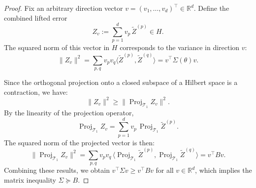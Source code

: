 \documentclass[10pt,a4paper]{amsart}
\begin{document}
\begin{proof}
Fix an arbitrary direction vector \(v=(v_1,\dots,v_d)^\top\in\mathbb{R}^d\). Define the combined lifted error
\[
Z_v := \sum_{p=1}^d v_p\,\widetilde Z^{(p)} \in H.
\]
The squared norm of this vector in \(H\) corresponds to the variance in direction \(v\):
\[
\| Z_v \|^2 = \sum_{p,q} v_p v_q \langle \widetilde Z^{(p)}, \widetilde Z^{(q)} \rangle = v^\top\Sigma(\theta)v.
\]

Since the orthogonal projection onto a closed subspace of a Hilbert space is a contraction, we have:
\[
\|Z_v\|^2 \ge \big\| \operatorname{Proj}_{\mathcal{T}_1} Z_v\big\|^2.
\]
By the linearity of the projection operator,
\[
\operatorname{Proj}_{\mathcal{T}_1} Z_v = \sum_{p=1}^d v_p\,\operatorname{Proj}_{\mathcal{T}_1}\widetilde Z^{(p)}.
\]
The squared norm of the projected vector is then:
\[
\big\| \operatorname{Proj}_{\mathcal{T}_1} Z_v\big\|^2
= \sum_{p,q} v_p v_q\,\big\langle \operatorname{Proj}_{\mathcal{T}_1}\widetilde Z^{(p)},\operatorname{Proj}_{\mathcal{T}_1}\widetilde Z^{(q)}\big\rangle
= v^\top B v.
\]
Combining these results, we obtain \(v^\top\Sigma v \ge v^\top B v\) for all \(v\in\mathbb{R}^d\), which implies the matrix inequality \(\Sigma\succeq B\).
\end{proof}
\end{document}
